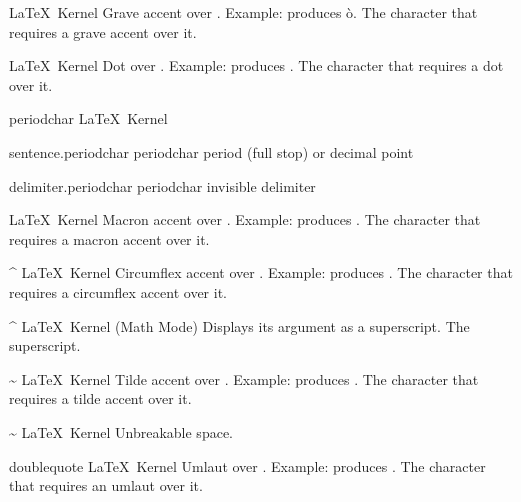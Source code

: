 %
 {}%
 {\LaTeX\ Kernel}%
 {Grave accent over . Example:
    produces \protect\`{o}.}%
 {%
   \BeginArgList
     The character that requires a grave
     accent over it.
   \EndArgList
 }

%
 {}%
 {\LaTeX\ Kernel}%
 {Dot over . Example:
    produces \odotover.%
 }%
 {%
   \BeginArgList
     The character that requires a dot
     over it.
   \EndArgList
 }

 {periodchar}
 {\periodsym}
 {}
 {\LaTeX\ Kernel}
 {\nopostdesc}
 {}

 {sentence.periodchar}
 {periodchar}
 {\periodsym}
 {period (full stop) or decimal point}

 {delimiter.periodchar}
 {periodchar}
 {\periodsym}
 {invisible delimiter}

%
 {}%
 {\LaTeX\ Kernel}%
 {Macron accent over . Example:
   \cmdname{=} produces \omacron.%
 }%
 {%
   \BeginArgList
     The character that requires a macron
     accent over it.
   \EndArgList
 }

 {\textasciicircum}
 {}
 {\LaTeX\ Kernel}
 {%
   Circumflex accent over . Example:
   \cmdname{\textasciicircum} produces \ocircum.%
 }
 {%
   \BeginArgList
     The character that requires a
     circumflex accent over it.
   \EndArgList
 }

 {\textasciicircum}
 {}
 {\LaTeX\ Kernel (Math Mode)}
 {Displays its argument as a superscript.}
 {%
   \BeginArgList
      The superscript.
   \EndArgList
 }

 {\textasciitilde}
 {}
 {\LaTeX\ Kernel}
 {%
   Tilde accent over . Example:
   \cmdname{\textasciitilde} produces \otilde.%
 }
 {%
   \BeginArgList
     The character that requires a
     tilde accent over it.
   \EndArgList
 }

 {\textasciitilde}
 {}
 {\LaTeX\ Kernel}
 {Unbreakable space.}
 {}

 {doublequote}
 {\doublequotesym}
 {}
 {\LaTeX\ Kernel}%
 {%
   Umlaut over . Example:
   \quotecs{} produces \oumlaut.%
 }%
 {%
   \BeginArgList
     The character that requires an umlaut
     over it.
   \EndArgList
 }

